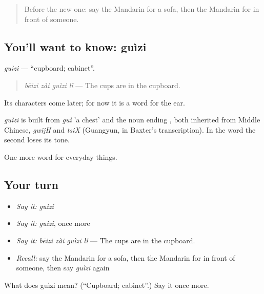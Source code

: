 \label{lesson:ZH-C175-guizi}



\begin{quote}
Before the new one: say the Mandarin for a sofa, then the Mandarin for in front of someone.
\end{quote}

\subsection*{You'll want to know: guìzi}
\emph{guìzi} — \textquotedblleft{}cupboard; cabinet\textquotedblright{}.

\begin{quote}
\emph{bēizi zài guìzi lǐ} — The cups are in the cupboard.
\end{quote}

Its characters come later; for now it is a word for the ear.

\begin{cousinweb}
\emph{guìzi} is built from \emph{guì} 'a chest' and the noun ending , both inherited from Middle Chinese, \emph{gwijH} and \emph{tsiX} (Guangyun, in Baxter's transcription). In the word the second loses its tone.
\end{cousinweb}

\begin{grammarlens}[title={What you've built}]
One more word for everyday things.
\end{grammarlens}

\subsection*{Your turn}
\begin{itemize}
\raggedright
  \item \emph{Say it:} \emph{guìzi}
  \item \emph{Say it:} \emph{guìzi}, once more
  \item \emph{Say it:} \emph{bēizi zài guìzi lǐ} — The cups are in the cupboard.
  \item \emph{Recall:} say the Mandarin for a sofa, then the Mandarin for in front of someone, then say \emph{guìzi} again
\end{itemize}

\begin{tcolorbox}[breakable,colback=teal!4,colframe=teal!35!black,title={Before you move on}]
What does guìzi mean? (\textquotedblleft{}Cupboard; cabinet\textquotedblright{}.) Say it once more.
\end{tcolorbox}
